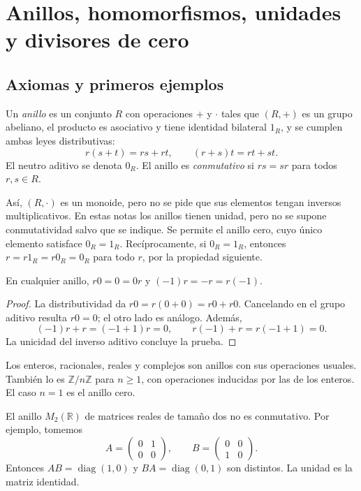 \section{Anillos, homomorfismos, unidades y divisores de cero}\label{sec:anillos-fundamentos}

\subsection{Axiomas y primeros ejemplos}\label{tema:11-1-1}
\begin{defi}
Un \emph{anillo} es un conjunto $R$ con operaciones $+$ y $\cdot$ tales que $(R,+)$ es un grupo abeliano, el producto es asociativo y tiene identidad bilateral $1_R$, y se cumplen ambas leyes distributivas:
\[
r(s+t)=rs+rt,\qquad (r+s)t=rt+st.
\]
El neutro aditivo se denota $0_R$. El anillo es \emph{conmutativo} si $rs=sr$ para todos $r,s\in R$.
\end{defi}
Así, $(R,\cdot)$ es un monoide, pero no se pide que sus elementos tengan inversos multiplicativos.
En estas notas los anillos tienen unidad, pero no se supone conmutatividad salvo que se indique. Se permite el anillo cero, cuyo único elemento satisface $0_R=1_R$. Recíprocamente, si $0_R=1_R$, entonces $r=r1_R=r0_R=0_R$ para todo $r$, por la propiedad siguiente.

\begin{lema}\label{lema:C11-cero}
En cualquier anillo, $r0=0=0r$ y $(-1)r=-r=r(-1)$.
\end{lema}
\begin{proof}
La distributividad da $r0=r(0+0)=r0+r0$. Cancelando en el grupo aditivo resulta $r0=0$; el otro lado es análogo. Además,
\[
(-1)r+r=(-1+1)r=0,\qquad r(-1)+r=r(-1+1)=0.
\]
La unicidad del inverso aditivo concluye la prueba.
\end{proof}

\begin{ejem}
Los enteros, racionales, reales y complejos son anillos con sus operaciones usuales. También lo es $\mathbb Z/n\mathbb Z$ para $n\geq1$, con operaciones inducidas por las de los enteros. El caso $n=1$ es el anillo cero.

El anillo $M_2(\mathbb R)$ de matrices reales de tamaño dos no es conmutativo. Por ejemplo, tomemos
\[
A=\begin{pmatrix}0&1\\0&0\end{pmatrix},\qquad
B=\begin{pmatrix}0&0\\1&0\end{pmatrix}.
\]
Entonces $AB=\operatorname{diag}(1,0)$ y $BA=\operatorname{diag}(0,1)$ son distintos. La unidad es la matriz identidad.
\end{ejem}

